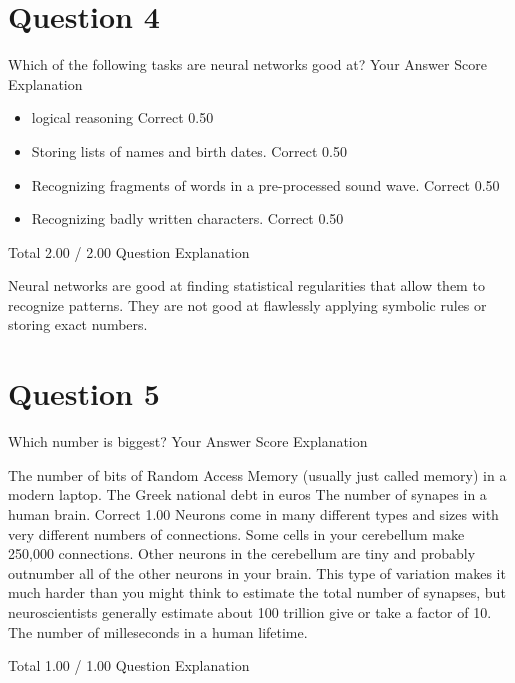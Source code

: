 \newpage
\section*{Question 4}
Which of the following tasks are neural networks good at?
Your Answer		Score	Explanation
\begin{itemize}
\item logical reasoning	Correct	0.50	
\item Storing lists of names and birth dates.	Correct	0.50	
\item Recognizing fragments of words in a pre-processed sound wave.	Correct	0.50	
\item Recognizing badly written characters.	Correct	0.50	
\end{itemize}
Total		2.00 / 2.00	
Question Explanation

Neural networks are good at finding statistical regularities that allow them to recognize patterns. 
They are not good at flawlessly applying symbolic rules or storing exact numbers.
\newpage
\section*{Question 5}
Which number is biggest?
Your Answer		Score	Explanation

The number of bits of Random Access Memory (usually just called memory) in a modern laptop.			
The Greek national debt in euros			
The number of synapes in a human brain.	Correct	1.00	Neurons come in many different types and sizes with very different numbers of connections. Some cells in your cerebellum make 250,000 connections. Other neurons in the cerebellum are tiny and probably outnumber all of the other neurons in your brain. This type of variation makes it much harder than you might think to estimate the total number of synapses, but neuroscientists generally estimate about 100 trillion give or take a factor of 10.
The number of milleseconds in a human lifetime.			

Total		1.00 / 1.00	
Question Explanation

